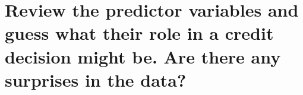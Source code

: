 \section{Review the predictor variables and guess what their role in a credit decision might be. Are there any surprises in the data?} \label{appendix}
